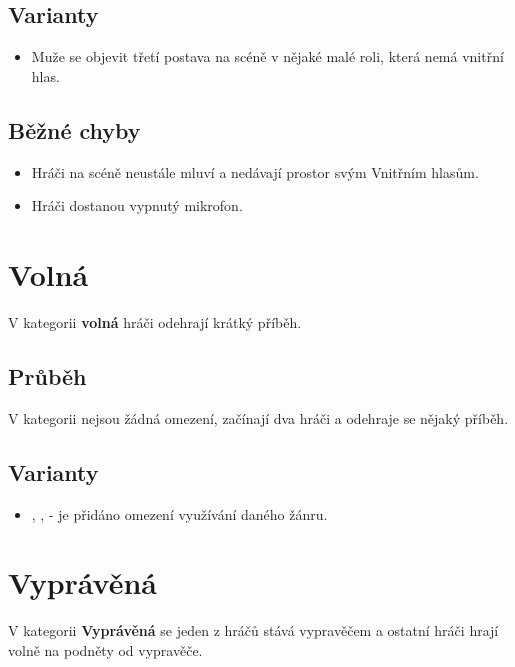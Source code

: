 \subsection{ Varianty } \begin{itemize}
\item Muže se objevit třetí postava na scéně v nějaké malé roli, která nemá vnitřní hlas.
\end{itemize}
 
\subsection{ Běžné chyby } \begin{itemize}
\item Hráči na scéně neustále mluví a nedávají prostor svým Vnitřním hlasům.
\item Hráči dostanou vypnutý mikrofon.
\end{itemize}
 
 
 
 
\needspace{5cm} \section{Volná} \label{volná}  
V kategorii \textbf{volná}{}  hráči odehrají krátký příběh. 
 
\subsection{Průběh} V kategorii nejsou žádná omezení, začínají dva hráči a odehraje se nějaký příběh. 
 
\subsection{Varianty} \begin{itemize}
\item {}, ,  - je přidáno omezení využívání daného žánru.
\end{itemize}
 
 
 
\needspace{5cm} \section{Vyprávěná} \label{vyprávěná}  
 
V kategorii \textbf{Vyprávěná}{} se jeden z hráčů stává vypravěčem a ostatní hráči hrají volně na podněty od vypravěče. 
 
